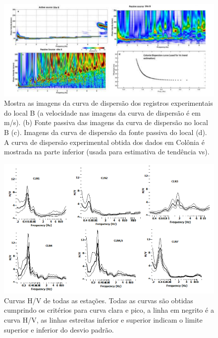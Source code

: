\documentclass[smallextended]{svjour3}       %
\begin{document}
\begin{figure}[!hbtp]
  \begin{center}
  
  \includegraphics[scale=0.6]{Figures/fig4.png}
  \end{center}
  \caption{Mostra as imagens da curva de dispersão dos registros experimentais do local B (a velocidade nas imagens da curva de dispersão é em m/s). (b) Fonte passiva das imagens da curva de dispersão no local B (c). Imagens da curva de dispersão da fonte passiva do local (d). A curva de dispersão experimental obtida dos dados em Colônia é mostrada na parte inferior (usada para estimativa de tendência vs).}
  \label{curva_disp}
\end{figure}

\begin{figure}[!hbtp]
  \begin{center}
  
  \includegraphics[scale=0.75]{Figures/fig5.png}
  \end{center}
  \caption{Curvas H/V de todas as estações. Todas as curvas são obtidas cumprindo os critérios para curva clara e pico, a linha em negrito é a curva H/V, as linhas estreitas inferior e superior indicam o limite superior e inferior do desvio padrão.}
  \label{hv_curva}
\end{figure}
\newpage
\end{document}
